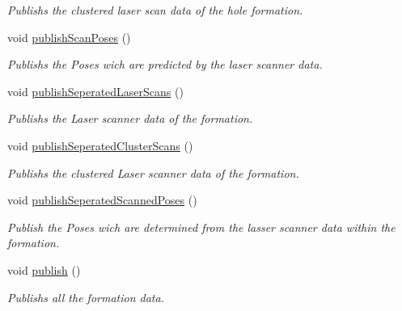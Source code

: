 \begin{DoxyCompactItemize}
\begin{DoxyCompactList}\small\item\em Publishs the clustered laser scan data of the hole formation. \end{DoxyCompactList}\item 
void \hyperlink{classFormationPublisher_a58a0b41ef89c603710aa9babac2d222a}{publish\+Scan\+Poses} ()\hypertarget{classFormationPublisher_a58a0b41ef89c603710aa9babac2d222a}{}\label{classFormationPublisher_a58a0b41ef89c603710aa9babac2d222a}

\begin{DoxyCompactList}\small\item\em Publishs the Poses wich are predicted by the laser scanner data. \end{DoxyCompactList}\item 
void \hyperlink{classFormationPublisher_a36f8a9d87cc5be6d8d01ee146c7339a9}{publish\+Seperated\+Laser\+Scans} ()\hypertarget{classFormationPublisher_a36f8a9d87cc5be6d8d01ee146c7339a9}{}\label{classFormationPublisher_a36f8a9d87cc5be6d8d01ee146c7339a9}

\begin{DoxyCompactList}\small\item\em Publishs the Laser scanner data of the formation. \end{DoxyCompactList}\item 
void \hyperlink{classFormationPublisher_a7b69ef4f03e3c9b15d504e4129f7c677}{publish\+Seperated\+Cluster\+Scans} ()\hypertarget{classFormationPublisher_a7b69ef4f03e3c9b15d504e4129f7c677}{}\label{classFormationPublisher_a7b69ef4f03e3c9b15d504e4129f7c677}

\begin{DoxyCompactList}\small\item\em Publishs the clustered Laser scanner data of the formation. \end{DoxyCompactList}\item 
void \hyperlink{classFormationPublisher_a0a01cba2ee701b66ea4bdc3a8d020da9}{publish\+Seperated\+Scanned\+Poses} ()\hypertarget{classFormationPublisher_a0a01cba2ee701b66ea4bdc3a8d020da9}{}\label{classFormationPublisher_a0a01cba2ee701b66ea4bdc3a8d020da9}

\begin{DoxyCompactList}\small\item\em Publish the Poses wich are determined from the lasser scanner data within the formation. \end{DoxyCompactList}\item 
void \hyperlink{classFormationPublisher_a4559382249eb3e051ac899d54bb0a1f0}{publish} ()\hypertarget{classFormationPublisher_a4559382249eb3e051ac899d54bb0a1f0}{}\label{classFormationPublisher_a4559382249eb3e051ac899d54bb0a1f0}

\begin{DoxyCompactList}\small\item\em Publishs all the formation data. \end{DoxyCompactList}\end{DoxyCompactItemize}
